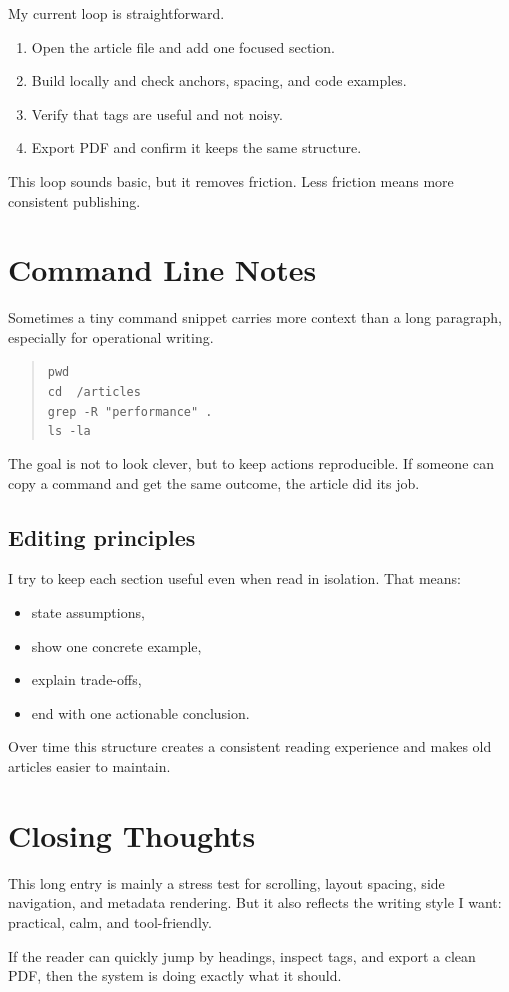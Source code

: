 My current loop is straightforward.

\begin{enumerate}
\item Open the article file and add one focused section.
\item Build locally and check anchors, spacing, and code examples.
\item Verify that tags are useful and not noisy.
\item Export PDF and confirm it keeps the same structure.
\end{enumerate}

This loop sounds basic, but it removes friction. Less friction means more consistent publishing.

\section{Command Line Notes}

Sometimes a tiny command snippet carries more context than a long paragraph, especially for operational writing.

\begin{quote}
\texttt{pwd}\\
\texttt{cd ~/articles}\\
\texttt{grep -R "performance" .}\\
\texttt{ls -la}
\end{quote}

The goal is not to look clever, but to keep actions reproducible. If someone can copy a command and get the same outcome, the article did its job.

\subsection{Editing principles}

I try to keep each section useful even when read in isolation. That means:

\begin{itemize}
\item state assumptions,
\item show one concrete example,
\item explain trade-offs,
\item end with one actionable conclusion.
\end{itemize}

Over time this structure creates a consistent reading experience and makes old articles easier to maintain.

\section{Closing Thoughts}

This long entry is mainly a stress test for scrolling, layout spacing, side navigation, and metadata rendering. But it also reflects the writing style I want: practical, calm, and tool-friendly.

If the reader can quickly jump by headings, inspect tags, and export a clean PDF, then the system is doing exactly what it should.
